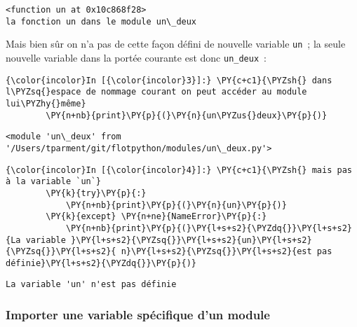     \begin{Verbatim}[commandchars=\\\{\},frame=single,framerule=0.3mm,rulecolor=\color{cellframecolor}]
<function un at 0x10c868f28>
la fonction un dans le module un\_deux
\end{Verbatim}

    Mais bien sûr on n'a pas de cette façon défini de nouvelle variable
\texttt{un}~; la seule nouvelle variable dans la portée courante est
donc \texttt{un\_deux}~:

    \begin{Verbatim}[commandchars=\\\{\},frame=single,framerule=0.3mm,rulecolor=\color{cellframecolor}]
{\color{incolor}In [{\color{incolor}3}]:} \PY{c+c1}{\PYZsh{} dans l\PYZsq{}espace de nommage courant on peut accéder au module lui\PYZhy{}même}
        \PY{n+nb}{print}\PY{p}{(}\PY{n}{un\PYZus{}deux}\PY{p}{)}
\end{Verbatim}


    \begin{Verbatim}[commandchars=\\\{\},frame=single,framerule=0.3mm,rulecolor=\color{cellframecolor}]
<module 'un\_deux' from '/Users/tparment/git/flotpython/modules/un\_deux.py'>
\end{Verbatim}

    \begin{Verbatim}[commandchars=\\\{\},frame=single,framerule=0.3mm,rulecolor=\color{cellframecolor}]
{\color{incolor}In [{\color{incolor}4}]:} \PY{c+c1}{\PYZsh{} mais pas à la variable `un`}
        \PY{k}{try}\PY{p}{:}
            \PY{n+nb}{print}\PY{p}{(}\PY{n}{un}\PY{p}{)}
        \PY{k}{except} \PY{n+ne}{NameError}\PY{p}{:} 
            \PY{n+nb}{print}\PY{p}{(}\PY{l+s+s2}{\PYZdq{}}\PY{l+s+s2}{La variable }\PY{l+s+s2}{\PYZsq{}}\PY{l+s+s2}{un}\PY{l+s+s2}{\PYZsq{}}\PY{l+s+s2}{ n}\PY{l+s+s2}{\PYZsq{}}\PY{l+s+s2}{est pas définie}\PY{l+s+s2}{\PYZdq{}}\PY{p}{)}
\end{Verbatim}


    \begin{Verbatim}[commandchars=\\\{\},frame=single,framerule=0.3mm,rulecolor=\color{cellframecolor}]
La variable 'un' n'est pas définie
\end{Verbatim}

    \hypertarget{importer-une-variable-spuxe9cifique-dun-module}{%
\subsubsection{Importer une variable spécifique d'un
module}\label{importer-une-variable-spuxe9cifique-dun-module}}

